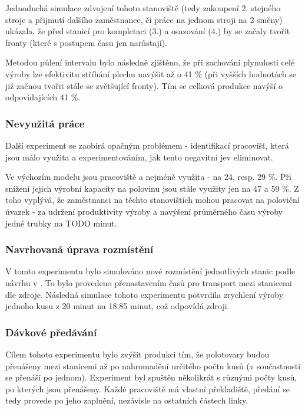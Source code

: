 \documentclass[11pt, a4paper]{article}
\begin{document}
Jednoduchá simulace zdvojení tohoto stanoviště (tedy zakoupení 2. stejného stroje a přijmutí dalšího zaměstnance, či práce na jednom stroji na 2 směny) ukázala, že před stanicí pro kompletaci (3.) a osazování (4.) by se začaly tvořit fronty (které s postupem času jen narůstají).

Metodou půlení intervalu bylo následně zjištěno, že při zachování plynulosti celé výroby lze efektivitu stříhání plechu navýšit až o 41 \% (při vyšších hodnotách se již začnou tvořit stále se zvětšující fronty). Tím se celková produkce navýší o odpovídajících 41 \%.

\subsubsection{Nevyužitá práce}
Další experiment se zaobírá opačným problémem - identifikací pracovišť, která jsou málo využita a experimentováním, jak tento negavitní jev eliminovat.

Ve výchozím modelu jsou pracoviště  a  nejméně využita - na 24, resp. 29 \%. Při snížení jejich výrobní kapacity na polovinu jsou stále využity jen na 47 a 59 \%. Z toho vyplývá, že zaměstnanci na těchto stanovištích mohou pracovat na poloviční úvazek - za udržení produktivity výroby a navýšení průměrného času výroby jedné trubky na TODO minut.


\subsubsection{Navrhovaná úprava rozmístění}
V tomto experimentu bylo simulováno nové rozmístění jednotlivých stanic podle návrhu v \cite[str. 51]{bp}. To bylo provedeno přenastavením časů pro transport mezi stanicemi dle zdroje. Následná simulace tohoto experimentu potvrdila zrychlení výroby jednoho kusu z 20 minut na 18.85 minut, což odpovídá zdroji.


\subsubsection{Dávkové předávání}
Cílem tohoto experimentu bylo zvýšit produkci tím, že polotovary budou přenášeny mezi stanicemi až po nahromadění určitého počtu kusů (v součastnosti se přenáší po jednom). Experiment byl spuštěn několikrát s různými počty kusů, po kterých jsou přenášeny. Každé pracoviště má vlastní překladiště, předání se tedy provede po jeho zaplnění, nezávisle na ostatních částech linky.
\end{document}
